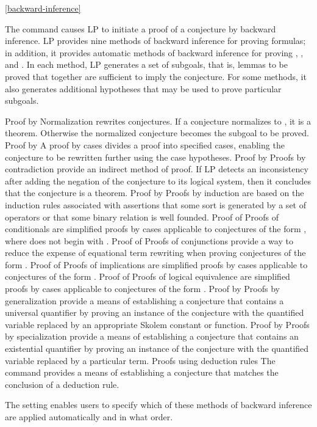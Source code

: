 \ref{backward-inference}

The  command causes LP to initiate a proof of a conjecture by
backward inference.  LP provides nine methods of backward inference for proving
formulas; in addition, it provides automatic methods of backward inference for
proving , , and
.  In each method, LP generates a
set of subgoals, that is, lemmas to be proved that together are sufficient to
imply the conjecture.  For some methods, it also generates additional
hypotheses that may be used to prove particular subgoals.
\p
\begin{description}
\dt Proof by 
\dd
Normalization rewrites conjectures.  If a conjecture normalizes to ,
it is a theorem.  Otherwise the normalized conjecture becomes the subgoal to be
proved.
\p
\dt Proof by 
\dd
A proof by cases divides a proof into specified cases, enabling the conjecture
to be rewritten further using the case hypotheses.
\p
\dt Proof by 
\dd
Proofs by contradiction provide an indirect method of proof.  If LP detects an
inconsistency after adding the negation of the conjecture to its logical
system, then it concludes that the conjecture is a theorem.
\p
\dt Proof by  
\dd
Proofs by induction are based on the induction rules associated with assertions
that some sort is generated by a set of operators or that some binary relation
is well founded.
\p
\dt Proof of 
\dd
Proofs of conditionals are simplified proofs by cases applicable to conjectures
of the form , where  does not begin
with .
\p
\dt Proof of 
\dd
Proofs of conjunctions provide a way to reduce the expense of equational term
rewriting when proving conjectures of the form .
\p
\dt Proof of 
\dd
Proofs of implications are simplified proofs by cases applicable to conjectures
of the form .
\p
\dt Proof of 
\dd
Proofs of logical equivalence are simplified proofs by cases applicable to
conjectures of the form .
\p
\dt Proof by 
\dd
Proofs by generalization provide a means of establishing a conjecture that
contains a universal quantifier by proving an instance of the conjecture with
the quantified variable replaced by an appropriate Skolem constant or function.
\p
\dt Proof by 
\dd
Proofs by specialization provide a means of establishing a conjecture that
contains an existential quantifier by proving an instance of the conjecture
with the quantified variable replaced by a particular term.
\p
\dt Proofs using deduction rules
\dd
The  command provides a means of establishing a conjecture that
matches the conclusion of a deduction rule.
\end{description}
The  setting enables users to specify which of these
methods of backward inference are applied automatically and in what order.

